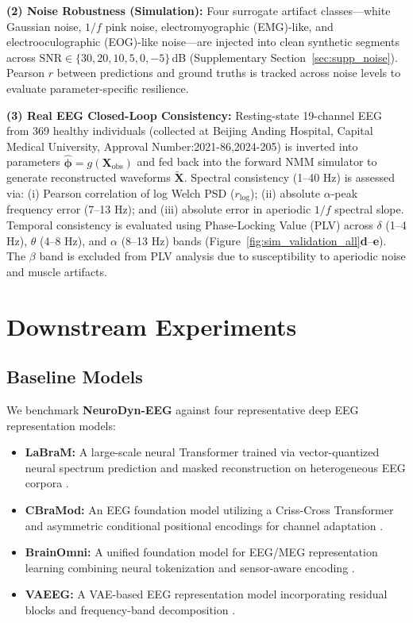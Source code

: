 \documentclass{article}
\begin{document}
{\textbf{(2) Noise Robustness (Simulation):} Four surrogate artifact classes---white Gaussian noise, $1/f$ pink noise, electromyographic (EMG)-like, and electrooculographic (EOG)-like noise---are injected into clean synthetic segments across $\text{SNR} \in \{30, 20, 10, 5, 0, -5\}$\,dB (Supplementary Section~\ref{sec:supp_noise}). Pearson $r$ between predictions and ground truths is tracked across noise levels to evaluate parameter-specific resilience.

\textbf{(3) Real EEG Closed-Loop Consistency:} Resting-state 19-channel EEG from 369 healthy individuals (collected at Beijing Anding Hospital, Capital Medical University, Approval Number:2021-86,2024-205) is inverted into parameters $\hat{\boldsymbol{\phi}}=g(\mathbf{X}_{\mathrm{obs}})$ and fed back into the forward NMM simulator to generate reconstructed waveforms $\tilde{\mathbf{X}}$. Spectral consistency (1--40 Hz) is assessed via: (i) Pearson correlation of log Welch PSD ($r_{\log}$); (ii) absolute $\alpha$-peak frequency error (7--13 Hz); and (iii) absolute error in aperiodic $1/f$ spectral slope. Temporal consistency is evaluated using Phase-Locking Value (PLV) across $\delta$ (1--4 Hz), $\theta$ (4--8 Hz), and $\alpha$ (8--13 Hz) bands (Figure~\ref{fig:sim_validation_all}\textbf{d}--\textbf{e}). The $\beta$ band is excluded from PLV analysis due to susceptibility to aperiodic noise and muscle artifacts.

\section{Downstream Experiments}

\subsection{Baseline Models}
We benchmark \textbf{NeuroDyn-EEG} against four representative deep EEG representation models:
\begin{itemize}
    \item \textbf{LaBraM:} A large-scale neural Transformer trained via vector-quantized neural spectrum prediction and masked reconstruction on heterogeneous EEG corpora \citep{jiang2024labram}.
    \item \textbf{CBraMod:} An EEG foundation model utilizing a Criss-Cross Transformer and asymmetric conditional positional encodings for channel adaptation \citep{wang2025cbramod}.
    \item \textbf{BrainOmni:} A unified foundation model for EEG/MEG representation learning combining neural tokenization and sensor-aware encoding \citep{yang2024brainomni}.
    \item \textbf{VAEEG:} A VAE-based EEG representation model incorporating residual blocks and frequency-band decomposition \citep{zhang2023vaeeg}.
\end{itemize}

}
\end{document}

